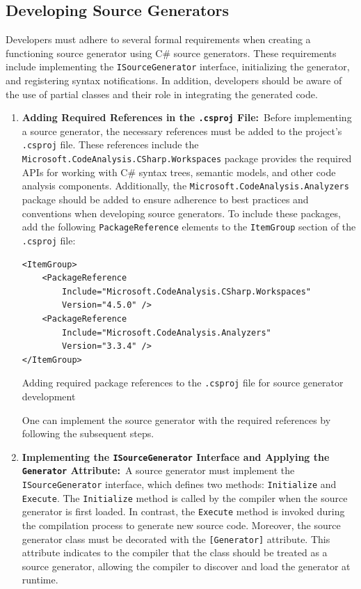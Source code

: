 \subsection{Developing Source Generators}

Developers must adhere to several formal requirements when creating a functioning source generator using C\# source generators. These requirements include implementing the \texttt{ISourceGenerator} interface, initializing the generator, and registering syntax notifications. In addition, developers should be aware of the use of partial classes and their role in integrating the generated code.

\begin{enumerate}

\item \textbf{Adding Required References in the \texttt{.csproj} File:}\
Before implementing a source generator, the necessary references must be added to the project's \texttt{.csproj} file. These references include the \texttt{Microsoft.CodeAnalysis.CSharp.Workspaces} package provides the required APIs for working with C\# syntax trees, semantic models, and other code analysis components. Additionally, the \texttt{Microsoft.CodeAnalysis.Analyzers} package should be added to ensure adherence to best practices and conventions when developing source generators. To include these packages, add the following \texttt{PackageReference} elements to the \texttt{ItemGroup} section of the \texttt{.csproj} file:

\begin{listing}[H]
\begin{verbatim}
<ItemGroup>
    <PackageReference 
        Include="Microsoft.CodeAnalysis.CSharp.Workspaces" 
        Version="4.5.0" />
    <PackageReference 
        Include="Microsoft.CodeAnalysis.Analyzers" 
        Version="3.3.4" />
</ItemGroup>
\end{verbatim}
\caption{Adding required package references to the \texttt{.csproj} file for source generator development}
\end{listing}

One can implement the source generator with the required references by following the subsequent steps.

\item \textbf{Implementing the \texttt{ISourceGenerator} Interface and Applying the \texttt{Generator} Attribute:}\
A source generator must implement the \texttt{ISourceGenerator} interface, which defines two methods: \texttt{Initialize} and \texttt{Execute}. The \texttt{Initialize} method is called by the compiler when the source generator is first loaded. In contrast, the \texttt{Execute} method is invoked during the compilation process to generate new source code. Moreover, the source generator class must be decorated with the \texttt{[Generator]} attribute. This attribute indicates to the compiler that the class should be treated as a source generator, allowing the compiler to discover and load the generator at runtime.


\end{enumerate}
